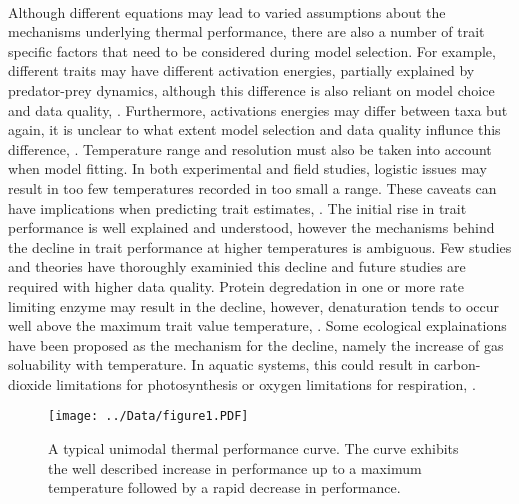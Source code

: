 \documentclass[11pt]{article}
\begin{document}
\noindent
\\Although different equations may lead to varied assumptions about the mechanisms underlying thermal performance, there are also a number of trait specific factors that need to be considered during model selection. For example, different traits may have different activation energies, partially explained by predator-prey dynamics, although this difference is also reliant on model choice and data quality, \cite{Dell2011}. Furthermore, activations energies may differ between taxa but again, it is unclear to what extent model selection and data quality influnce this difference, \cite{Chen2017}. Temperature range and resolution must also be taken into account when model fitting. In both experimental and field studies, logistic issues may result in too few temperatures recorded in too small a range. These caveats can have implications when predicting trait estimates, \cite{Knies2010}. The initial rise in trait performance is well explained and understood, however the mechanisms behind the decline in trait performance at higher temperatures is ambiguous. Few studies and theories have thoroughly examinied this decline and future studies are required with higher data quality. Protein degredation in one or more rate limiting enzyme may result in the decline, however, denaturation tends to occur well above the maximum trait value temperature, \cite{Schipper2014}. Some ecological explainations have been proposed as the mechanism for the decline, namely the increase of gas soluability with temperature. In aquatic systems, this could result in carbon-dioxide limitations for photosynthesis or oxygen limitations for respiration, \cite{Portner2010}.\\

\begin{figure}[H]
      \texttt{[image: ../Data/figure1.PDF]}
      \centering
      \caption{A typical unimodal thermal performance curve. The curve exhibits the well described increase in performance up to a maximum temperature followed by a rapid decrease in performance.}
\end{figure}\\
\end{document}
